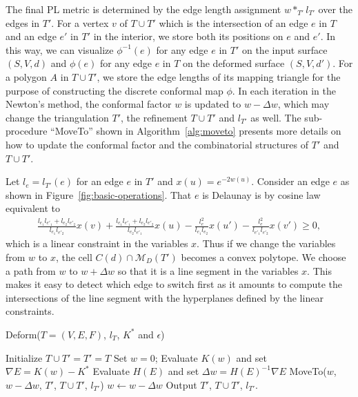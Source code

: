 \documentclass[11pt]{article}
\begin{document}
The final PL metric is determined by the edge length assignment $w *_{T'} l_{T'}$ over the edges in $T'$.
For a vertex $v$ of $T\cup T'$ which is the intersection of an edge $e$ in $T$ and 
an edge $e'$ in $T'$ in the interior, we store both its positions on $e$ and $e'$. In this way, 
we can visualize $\phi^{-1}(e)$ for any edge $e$ in $T'$ on the input surface 
$(S, V, d)$ and $\phi(e)$ for any edge $e$ in $T$ on the deformed surface $(S, V, d')$. 
For a polygon $A$ in $T\cup T'$, we store the edge lengths of its mapping triangle
for the purpose of constructing the discrete conformal map $\phi$.  
In each iteration in the Newton's method, the conformal factor $w$ is updated to $w-\Delta w$, 
which may change the triangulation $T'$, the refinement $T\cup T'$ and $l_{T'}$ as well. 
The sub-procedure ``MoveTo'' shown in Algorithm~\ref{alg:moveto} presents more details on how to 
update the conformal factor and the combinatorial structures of $T'$ and $T\cup T'$. 


Let $l_e = l_{T'}(e)$ for an 
edge $e$ in $T'$ and $x(u) =e^{-2w(u)}$. Consider an edge $e$
as shown in Figure~\ref{fig:basic-operations}.  That $e$ is Delaunay is by cosine law
equivalent to 
\begin{eqnarray}
\frac{l_{e_1}l_{e'_1}+l_{e_2}l_{e'_2}}{l_{e_1}l_{e'_2}}x(v)+ \frac{l_{e_1}l_{e'_1}+l_{e_2}l_{e'_2}}{l_{e_2}l_{e'_1}}
x(u)- \frac{l_{e}^2}{l_{e_1}l_{e_2}}x(u')- \frac{l_{e}^2}{l_{e'_1}l_{e'_2}}x(v') \geq 0, 
\end{eqnarray}
which is a linear constraint in the variables $x$. Thus if we change the variables from $w$ to $x$, the 
cell $C(d) \cap \mathcal{M}_D(T')$ becomes a convex polytope. We choose a path from $w$ to $w+\Delta w$
so that it is a line segment in the variables $x$. This makes it easy to detect which edge to switch first
as it amounts to compute the intersections of the line segment with the hyperplanes defined by the 
linear constraints.  

\begin{algorithm}[!h]
\caption{Deform($T=(V, E, F)$, $l_T$, $K^*$ and $\epsilon$)}
\label{alg:deform}
\begin{algorithmic}[1]
\STATE Initialize $T\cup T' = T' = T$
\STATE Set $w=0$;
\STATE Evaluate $K(w)$ and set $\nabla E = K(w) - K^*$
\STATE Evaluate $H(E)$ and set $\Delta w = H(E)^{-1} \nabla E$ 
\STATE MoveTo($w$, $w-\Delta w$, $T'$, $T\cup T'$, $l_{T'}$)
\STATE $w \leftarrow w-\Delta w$
\ENDWHILE
\STATE Output $T'$, $T\cup T'$, $l_{T'}$.
\end{algorithmic}
\end{algorithm}
\end{document}
